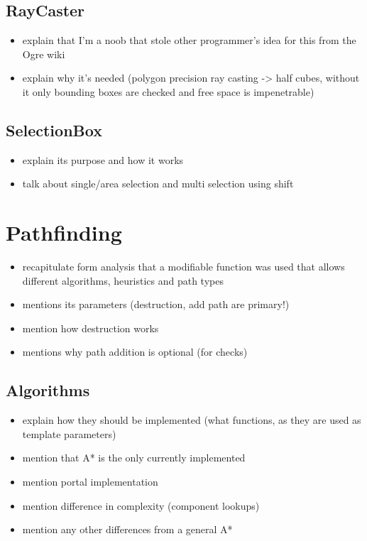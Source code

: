 \subsection{RayCaster}

\begin{itemize}
    \item explain that I'm a noob that stole other programmer's idea for this
        from the Ogre wiki
    \item explain why it's needed (polygon precision ray casting -> half cubes,
        without it only bounding boxes are checked and free space is impenetrable)
\end{itemize}

\subsection{SelectionBox}

\begin{itemize}
    \item explain its purpose and how it works
    \item talk about single/area selection and multi selection using shift
\end{itemize}

\section{Pathfinding}

\begin{itemize}
    \item recapitulate form analysis that a modifiable function was used
        that allows different algorithms, heuristics and path types
    \item mentions its parameters (destruction, add path are primary!)
    \item mention how destruction works
    \item mentions why path addition is optional (for checks)
\end{itemize}

\subsection{Algorithms}

\begin{itemize}
    \item explain how they should be implemented (what functions, as they
        are used as template parameters)
    \item mention that A* is the only currently implemented
    \item mention portal implementation
    \item mention difference in complexity (component lookups)
    \item mention any other differences from a general A*
\end{itemize}

